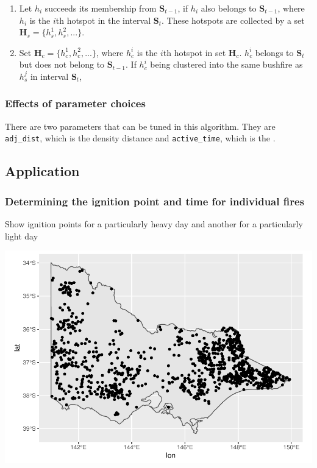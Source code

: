 \begin{enumerate}
\def\labelenumi{(\alph{enumi})}
\item
  Let \(h_i\) succeeds its membership from \(\boldsymbol{S}_{t-1}\), if
  \(h_i\) also belongs to \(\boldsymbol{S}_{t-1}\), where \(h_i\) is the
  \(i\)th hotspot in the interval \(\boldsymbol{S}_t\). These hotspots
  are collected by a set \(\boldsymbol{H}_s = \{h_s^1,h_s^2,...\}\).
\item
  Set \(\boldsymbol{H}_c = \{h_c^1,h_c^2,...\}\), where \(h_c^i\) is the
  \(i\)th hotspot in set \(\boldsymbol{H}_c\). \(h_c^i\) belongs to
  \(\boldsymbol{S}_t\) but does not belong to \(\boldsymbol{S}_{t-1}\).
  If \(h_c^i\) being clustered into the same bushfire as \(h_s^j\) in
  interval \(\boldsymbol{S}_t\),
\end{enumerate}

\hypertarget{effects-of-parameter-choices}{%
\subsubsection{Effects of parameter
choices}\label{effects-of-parameter-choices}}

There are two parameters that can be tuned in this algorithm. They are
\texttt{adj\_dist}, which is the density distance and
\texttt{active\_time}, which is the .

\hypertarget{application}{%
\subsection{Application}\label{application}}

\hypertarget{determining-the-ignition-point-and-time-for-individual-fires}{%
\subsubsection{Determining the ignition point and time for individual
fires}\label{determining-the-ignition-point-and-time-for-individual-fires}}

Show ignition points for a particularly heavy day and another for a
particularly light day

\begin{Schunk}

\includegraphics[width=0.8\linewidth]{clustering_paper_files/figure-latex/unnamed-chunk-2-1} \end{Schunk}

